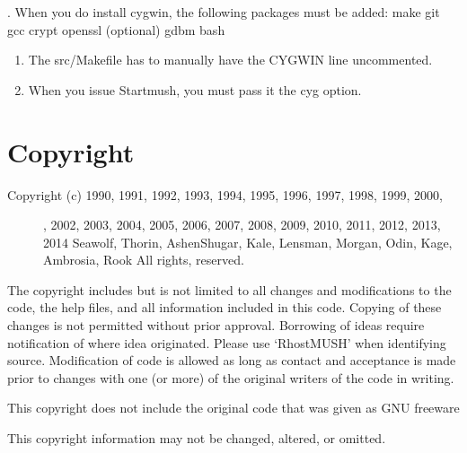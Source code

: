 \documentclass[letterpaper,10pt,english]{sphinxmanual}
\begin{document}
.  When you do install cygwin, the following packages must be added:
make
git
gcc
crypt
openssl (optional)
gdbm
bash
\begin{enumerate}
%
\setcounter{enumi}{1}
\item {} 
\sphinxAtStartPar
The src/Makefile has to manually have the CYGWIN line uncommented.

\item {} 
\sphinxAtStartPar
When you issue Startmush, you must pass it the \sphinxhyphen{}cyg option.

\end{enumerate}


\chapter{Copyright}
\label{\detokenize{copyright:copyright}}\label{\detokenize{copyright:id1}}\label{\detokenize{copyright::doc}}\begin{description}
\item[{Copyright (c) 1990, 1991, 1992, 1993, 1994, 1995, 1996, 1997, 1998, 1999, 2000,}] \leavevmode
{}, 2002, 2003, 2004, 2005, 2006, 2007, 2008, 2009, 2010, 2011,
2012, 2013, 2014
Seawolf, Thorin, Ashen\sphinxhyphen{}Shugar, Kale, Lensman, Morgan, Odin, Kage,
Ambrosia, Rook
All rights, reserved.

\end{description}

\sphinxAtStartPar
The copyright includes but is not limited to all changes and modifications to
the code, the help files, and all information included in this code.
Copying of these changes is not permitted without prior approval.
Borrowing of ideas require notification of where idea originated.
Please use ‘RhostMUSH’ when identifying source. Modification of code is allowed
as long as contact and acceptance is made prior to changes with one (or more) of
the original writers of the code in writing.

\sphinxAtStartPar
This copyright does not include the original code that was given as GNU freeware

\sphinxAtStartPar
This copyright information may not be changed, altered, or omitted.
\end{document}
